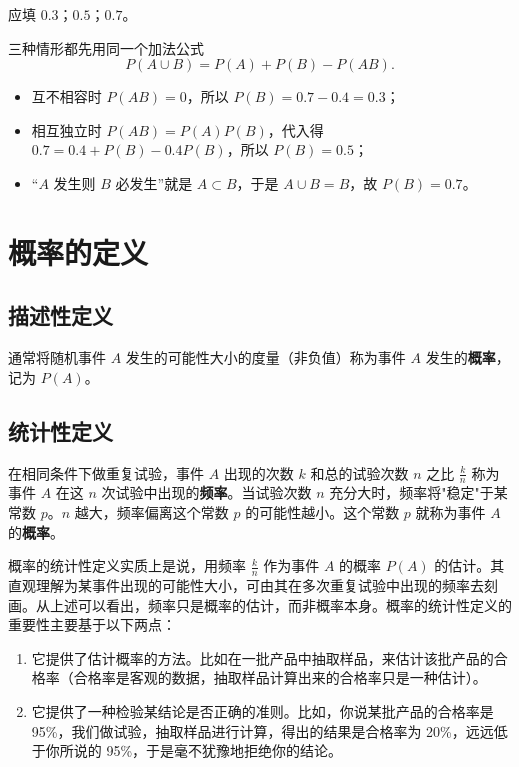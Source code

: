 ﻿\documentclass[lang=cn,11pt]{elegantbook}
\begin{document}
\begin{solution}
应填 \(0.3\)；\(0.5\)；\(0.7\)。

三种情形都先用同一个加法公式
\[
P(A\cup B)=P(A)+P(B)-P(AB).
\]
\begin{itemize}
    \item 互不相容时 \(P(AB)=0\)，所以 \(P(B)=0.7-0.4=0.3\)；
    \item 相互独立时 \(P(AB)=P(A)P(B)\)，代入得 \(0.7=0.4+P(B)-0.4P(B)\)，所以 \(P(B)=0.5\)；
    \item “\(A\) 发生则 \(B\) 必发生”就是 \(A\subset B\)，于是 \(A\cup B=B\)，故 \(P(B)=0.7\)。
\end{itemize}
\end{solution}

\section{概率的定义}

\subsection{描述性定义}

通常将随机事件 \(A\) 发生的可能性大小的度量（非负值）称为事件 \(A\) 发生的\textbf{概率}，记为 \(P(A)\)。

\subsection{统计性定义}

在相同条件下做重复试验，事件 \(A\) 出现的次数 \(k\) 和总的试验次数 \(n\) 之比 \(\frac{k}{n}\) 称为事件 \(A\) 在这 \(n\) 次试验中出现的\textbf{频率}。当试验次数 \(n\) 充分大时，频率将"稳定"于某常数 \(p\)。\(n\) 越大，频率偏离这个常数 \(p\) 的可能性越小。这个常数 \(p\) 就称为事件 \(A\) 的\textbf{概率}。

\begin{note}
概率的统计性定义实质上是说，用频率 \(\frac{k}{n}\) 作为事件 \(A\) 的概率 \(P(A)\) 的估计。其直观理解为某事件出现的可能性大小，可由其在多次重复试验中出现的频率去刻画。从上述可以看出，频率只是概率的估计，而非概率本身。概率的统计性定义的重要性主要基于以下两点：
\begin{enumerate}
    \item 它提供了估计概率的方法。比如在一批产品中抽取样品，来估计该批产品的合格率（合格率是客观的数据，抽取样品计算出来的合格率只是一种估计）。
    \item 它提供了一种检验某结论是否正确的准则。比如，你说某批产品的合格率是 95\%，我们做试验，抽取样品进行计算，得出的结果是合格率为 20\%，远远低于你所说的 95\%，于是毫不犹豫地拒绝你的结论。
\end{enumerate}
\end{note}
\end{document}
